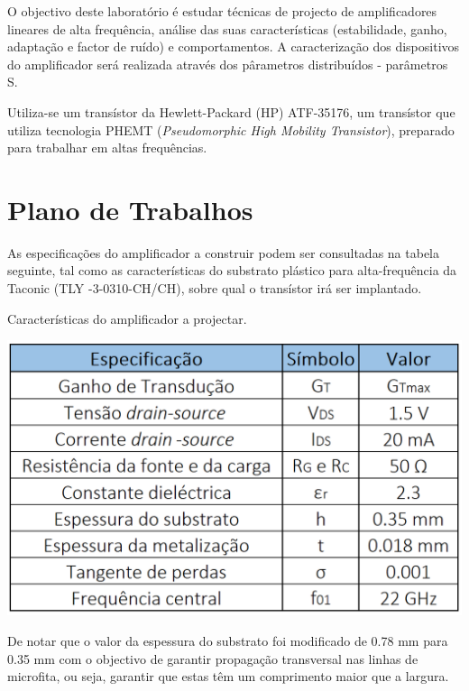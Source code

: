 \documentclass[11pt]{article}
\numberwithin{equation}{section}
\begin{document}

O objectivo deste laboratório é estudar técnicas de projecto de amplificadores lineares de alta frequência, análise das suas características (estabilidade, ganho, adaptação e factor de ruído) e comportamentos. A caracterização dos dispositivos do amplificador será realizada através dos pârametros distribuídos - parâmetros S.

Utiliza-se um transístor da Hewlett-Packard (HP) ATF-35176, um transístor que utiliza tecnologia PHEMT (\textit{Pseudomorphic High Mobility Transistor}), preparado para trabalhar em altas frequências.

\section{Plano de Trabalhos}

As especificações do amplificador a construir podem ser consultadas na tabela seguinte, tal como as características do substrato plástico para alta-frequência da Taconic (TLY -3-0310-CH/CH), sobre qual o transístor irá ser implantado. 

\begin{table}[H]
	\centering
	\caption{Características do amplificador a projectar.}
	\vspace{-1.5mm}
	\includegraphics[keepaspectratio=true, scale=0.40]{teoricas/table1}
	\label{tab:car}
\end{table}

De notar que o valor da espessura do substrato foi modificado de 0.78 mm para 0.35 mm com o objectivo de garantir propagação transversal nas linhas de microfita, ou seja, garantir que estas têm um comprimento maior que a largura. 
\end{document}
